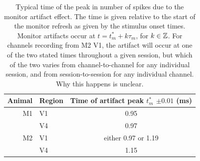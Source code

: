 \begin{table}[hbtp]
\caption{Typical time of the peak in number of spikes due to the monitor artifact effect.
The time is given relative to the start of the monitor refresh as given by the stimulus onset times.
Monitor artifacts occur at $t = t^*_m + k \tau_m$, for $k \in \mathbb{Z}$.
For channels recording from \ac{M2} \ac{V1}, the artifact will occur at one of the two stated times throughout a given session, but which of the two varies from channel-to-channel for any individual session, and from session-to-session for any individual channel.
Why this happens is unclear.}
\label{tab:mapeak}
\begin{center}
\begin{tabular}{rlc}
\toprule
Animal  & Region & Time of artifact peak $t^*_m$ $\pm 0.01$ (\si{\milli\second})
\\
\midrule
M1  & V1    & 0.95
\\
        & V4    & 0.97
\\
M2    & V1    & either 0.97 or 1.19
\\
        & V4    & 1.15
\\
\bottomrule
\end{tabular}
\end{center}
\end{table}


